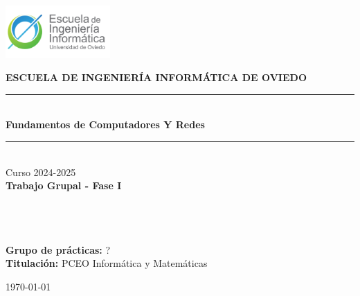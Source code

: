 \documentclass[11pt,a4paper]{article}
\begin{document}
\begin{titlepage}
    \begin{center}
        \includegraphics[width=0.3\textwidth]{logo_escuela.png} \\[1cm] %
        \vspace{1cm}
        
        \textbf{\LARGE ESCUELA DE INGENIERÍA INFORMÁTICA DE OVIEDO} \\[1.5cm]
        
        \rule{\linewidth}{0.5mm} \\[0.4cm]
        \textbf{\Huge Fundamentos de Computadores Y Redes} \\[0.3cm]
        \rule{\linewidth}{0.5mm} \\[1cm]
        
        {\Large Curso 2024-2025} \\[1.5cm]
        
        \textbf{\LARGE Trabajo Grupal - Fase I} \\[0.8cm]
        
        \\[0.15cm]
        \\[0.15cm]
        \\[0.15cm]
        
        \vfill
        
        \begin{flushright}

            \textbf{Grupo de prácticas:} ? \\[0.3cm]
            \textbf{Titulación:} PCEO Informática y Matemáticas \\[0.3cm]
        \end{flushright}
        
        \vfill
        
        \today \\[1cm]
    \end{center}
  \end{titlepage}
\end{document}
